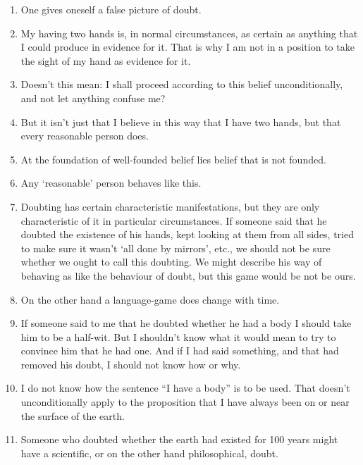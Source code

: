 \documentclass{book}
\begin{document}
\begin{enumerate}
\item
One gives oneself a false picture of doubt.

\item
My having two hands is, in normal circumstances, as certain as anything that I
could produce in evidence for it.  That is why I am not in a position to take
the sight of my hand as evidence for it.

\item
Doesn't this mean: I shall proceed according to this belief unconditionally,
and not let anything confuse me?

\item
But it isn't just that I believe in this way that I have two hands, but that
every reasonable person does.

\item
At the foundation of well-founded belief lies belief that is not founded.

\item
Any `reasonable' person behaves like this.

\item
Doubting has certain characteristic manifestations, but they are only
characteristic of it in particular circumstances. If someone said that he
doubted the existence of his hands, kept looking at them from all sides, tried
to make sure it wasn't `all done by mirrors', etc., we should not be sure
whether we ought to call this doubting. We might describe his way of behaving
as like the behaviour of doubt, but this game would be not be ours.

\item
On the other hand a language-game does change with time.

\item
If someone said to me that he doubted whether he had a body I should take him
to be a half-wit. But I shouldn't know what it would mean to try to convince
him that he had one. And if I had said something, and that had removed his
doubt, I should not know how or why.

\item
I do not know how the sentence ``I have a body'' is to be used.  That doesn't
unconditionally apply to the proposition that I have always been on or near the
surface of the earth.

\item
Someone who doubted whether the earth had existed for 100 years might have a
scientific, or on the other hand philosophical, doubt.


\end{enumerate}
\end{document}
